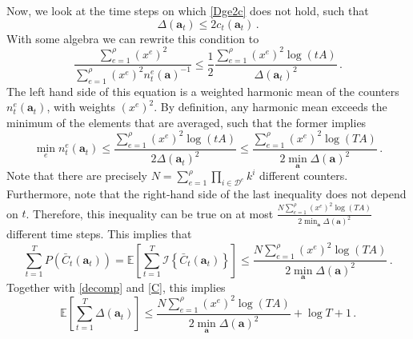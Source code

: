 \documentclass{article}
\newcommand{\ind}[1]{\mathcal{I}\!\left\{#1\right\}}
\newcommand{\prob}[1]{P\left( #1 \right)}
\begin{document}
Now, we look at the time steps on which \eqref{Dge2c} does not hold, such that
\[
\Delta(\mathbf{a}_t) \le 2 c_t( \mathbf{a}_t ) \,.
\]
With some algebra we can rewrite this condition to
\[
\frac{\sum_{e=1}^\rho (x^e)^2 }{\sum_{e=1}^\rho (x^e)^2 n^e_t(\mathbf{a})^{-1}} \le \frac{1}{2} \frac{\sum_{e=1}^\rho (x^e)^2 \log ( t A )}{\Delta(\mathbf{a}_t)^2} \,.
\]
The left hand side of this equation is a weighted harmonic mean of the counters $n^e_t(\mathbf{a}_t)$, with weights $(x^e)^2$. By definition, any harmonic mean exceeds the minimum of the elements that are averaged, such that the former implies
\[
\min_e n^e_t(\mathbf{a}_t)
\le \frac{\sum_{e=1}^\rho (x^e)^2 \log ( t A )}{2 \Delta(\mathbf{a}_t)^2}
\le \frac{\sum_{e=1}^\rho (x^e)^2 \log ( T A )}{2 \min_\mathbf{a} \Delta(\mathbf{a})^2}\,.
\]
Note that there are precisely $N = \sum_{e=1}^\rho \prod_{i \in \mathcal{D}^e} k^i$ different counters. Furthermore, note that the right-hand side of the last inequality does not depend on $t$. Therefore, this inequality can be true on at most $\frac{N \sum_{e=1}^\rho (x^e)^2 \log ( T A )}{2 \min_\mathbf{a} \Delta(\mathbf{a})^2}$ different time steps. This implies that
\[
\sum_{t=1}^T \prob{ \bar{C}_t(\mathbf{a}_t) }
=
\mathbb{E}\left[ \sum_{t=1}^T \ind{ \bar{C}_t(\mathbf{a}_t) } \right]
\le 
\frac{N \sum_{e=1}^\rho (x^e)^2 \log ( T A )}{2 \min_\mathbf{a} \Delta(\mathbf{a})^2} \,.
\]
Together with \eqref{decomp} and \eqref{C}, this implies
\[
\mathbb{E} \left[ \sum_{t=1}^T \Delta(\mathbf{a}_t) \right] \le\frac{N \sum_{e=1}^\rho (x^e)^2 \log ( T A )}{2 \min_\mathbf{a} \Delta(\mathbf{a})^2} + \log T + 1\,.
\]
\end{document}
